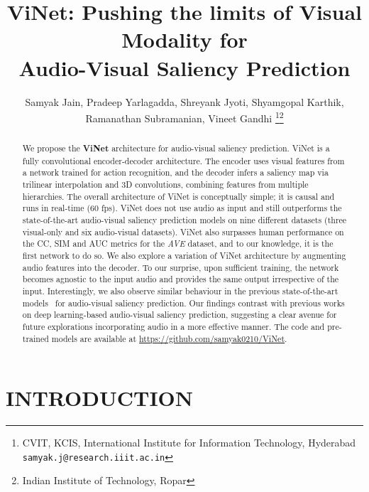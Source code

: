 \documentclass[letterpaper, 10 pt, conference]{ieeeconf}  \usepackage{times}
\title{\LARGE \bf
ViNet: Pushing the limits of Visual Modality for \\ Audio-Visual Saliency Prediction
}
\author{Samyak Jain,  Pradeep Yarlagadda,   Shreyank Jyoti,  Shyamgopal Karthik,  \\ Ramanathan Subramanian,  Vineet Gandhi \thanks{ CVIT, KCIS, International Institute for Information Technology, Hyderabad
        {\tt\small samyak.j@research.iiit.ac.in}}\thanks{Indian Institute of Technology, Ropar}}
\begin{document}
\def\x{{\mathbf x}}
\def\L{{\cal L}}
\def\eg{\textit{e.g.}}
\def\ie{\textit{i.e. }}
\def\Eg{\textit{E.g.}}
\def\etal{\textit{et al.}}
\def\etc{\textit{etc}}


\maketitle
\thispagestyle{empty}
\pagestyle{empty}


\begin{abstract}
We propose the \textbf{ViNet} architecture for audio-visual saliency prediction. ViNet is a fully convolutional encoder-decoder architecture. The encoder uses visual features from a network trained for action recognition, and the decoder infers a saliency map via trilinear interpolation and 3D convolutions, combining features from multiple hierarchies. The overall architecture of ViNet is conceptually simple; it is causal and runs in real-time (60 fps). ViNet does not use audio as input and still outperforms the state-of-the-art audio-visual saliency prediction models on nine different datasets (three visual-only and six audio-visual datasets). ViNet also surpasses human performance on the CC, SIM and AUC metrics for the \emph{AVE} dataset, and to our knowledge, it is the first network to do so. We also explore a variation of ViNet architecture by augmenting audio features into the decoder. To our surprise, upon sufficient training, the network becomes agnostic to the input audio and provides the same output irrespective of the input. Interestingly, we also observe similar behaviour in the previous state-of-the-art models~\cite{tsiami2020stavis} for audio-visual saliency prediction. Our findings contrast with previous works on deep learning-based audio-visual saliency prediction, suggesting a clear avenue for future explorations incorporating audio in a more effective manner. The code and pre-trained models are available at \url{https://github.com/samyak0210/ViNet}. 



\end{abstract}


\section{INTRODUCTION}
\end{document}
